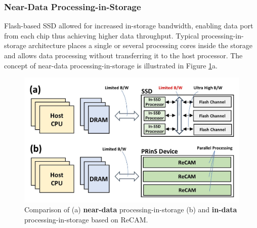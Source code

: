\documentclass{superfri}
\begin{document}
\subsubsection{Near-Data Processing-in-Storage}
\label{sec:NDP_PRinS}
Flash-based SSD allowed for increased in-storage bandwidth, enabling data port from each chip thus achieving higher data throughput. Typical processing-in-storage architecture places a single or several processing cores inside the storage and allows data processing without transferring it to the host processor. The concept of near-data processing-in-storage is illustrated in Figure \ref{fig:in_vs_near_data}a. 

\begin{figure}[h!]
	\centerline{\includegraphics{Figures/In_vs_near_data.jpg}}
	\caption{Comparison of (a) \textbf{near-data} processing-in-storage (b) and \textbf{in-data} processing-in-storage based on ReCAM.}
	\label{fig:in_vs_near_data}
\end{figure}
\end{document}

